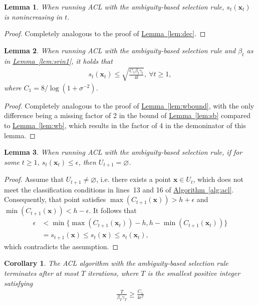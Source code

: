 \documentclass{article}
\def\*#1{\bm{#1}}
\newcommand{\algoref}[1]{\hyperref[#1]{\mbox{Algorithm~\ref*{#1}}}}
\newcommand{\lemmaref}[1]{\hyperref[#1]{\mbox{Lemma~\ref*{#1}}}}
\newtheorem{lemma}{Lemma}
\newtheorem{cor}{Corollary}
\newcommand{\acl}{\textsf{ACL}\xspace}
\begin{document}
\begin{lemma}
When running \acl with the ambiguity-based selection rule,
$s_t(\*x_t)$ is nonincreasing in $t$.
\end{lemma}
\begin{proof}
Completely analogous to the proof of \lemmaref{lem:dec}.
\end{proof}

\begin{lemma}
\label{lem:sbound}
When running \acl with the ambiguity-based selection rule and
$\beta_t$ as in \lemmaref{lem:srin1}, it holds that
\begin{align*}
s_t(\*x_t) \leq \sqrt{\frac{C_1 \beta_t \gamma_t}{4t}},\ \forall t \geq 1,
\end{align*}
where $C_1 = 8 / \log(1 + \sigma^{-2})$.
\end{lemma}
\begin{proof}
Completely analogous to the proof of \lemmaref{lem:wbound}, with
the only difference being a missing factor of 2 in the bound
of \lemmaref{lem:sb} compared to \lemmaref{lem:wb}, which results
in the factor of 4 in the demoninator of this lemma.
\end{proof}

\begin{lemma}
\label{lem:sterm}
When running \acl with the ambiguity-based selection rule,
if for some $t \geq 1$, $s_t(\*x_t) \leq \epsilon$,
then $U_{t+1} = \varnothing$.
\end{lemma}
\begin{proof}
Assume that $U_{t+1} \neq \varnothing$, i.e. there exists a point
$\*x \in U_t$, which does not meet the classification conditions in
lines~13 and 16 of \algoref{alg:acl}. Consequently, that point
satisfies $\max(C_{t+1}(\*x)) > h + \epsilon$ and
$\min(C_{t+1}(\*x)) < h - \epsilon$. It follows that
\begin{align*}
\epsilon &< \min\{\max(C_{t+1}(\*x_t))-h, h-\min(C_{t+1}(\*x_t))\}\\
&= s_{t+1}(\*x) \leq s_t(\*x) \leq s_t(\*x_t),
\end{align*}
which contradicts the assumption.
\end{proof}

\begin{cor}
\label{cor:siter}
The \acl algorithm with the ambiguity-based selection rule terminates
after at most $T$ iterations, where $T$
is the smallest positive integer satisfying
\begin{align*}
\frac{T}{\beta_T \gamma_T} \geq \frac{C_1}{4\epsilon^2}
\end{align*}
\end{cor}
\end{document}
